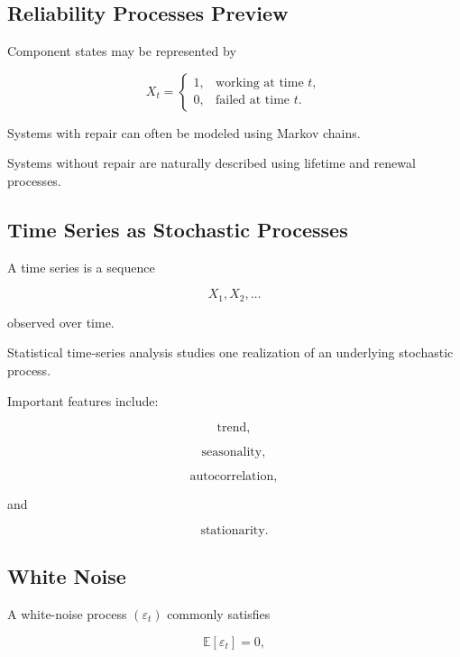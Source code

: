 \subsection{Reliability Processes Preview}
\label{subsec:reliability-processes-preview}

Component states may be represented by

\[
X_t
=
\begin{cases}
1,&\text{working at time }t,\\
0,&\text{failed at time }t.
\end{cases}
\]

Systems with repair can often be modeled using Markov chains.

Systems without repair are naturally described using lifetime and
renewal processes.

\subsection{Time Series as Stochastic Processes}
\label{subsec:time-series-stochastic-process}

A time series is a sequence

\[
\boxed{
X_1,X_2,\ldots
}
\]

observed over time.

Statistical time-series analysis studies one realization of an
underlying stochastic process.

Important features include:

\[
\text{trend},
\]

\[
\text{seasonality},
\]

\[
\text{autocorrelation},
\]

and

\[
\text{stationarity}.
\]

\subsection{White Noise}
\label{subsec:white-noise-process}

A white-noise process \((\varepsilon_t)\) commonly satisfies

\[
\boxed{
\mathbb{E}[\varepsilon_t]=0,
}
\]

